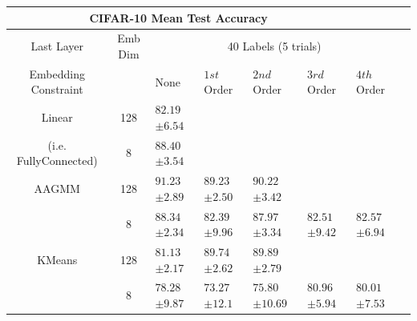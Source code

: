 \documentclass[10pt,twocolumn,letterpaper]{article}
\begin{document}
\begin{table}[ht!]
	\begin{tabularx}{\textwidth}{c|c|XXXXXX}
		\multicolumn{6}{c}{CIFAR-10 Mean Test Accuracy} \\ \hline\hline
		Last Layer &   Emb Dim   & \multicolumn{5}{c}{40 Labels (5 trials)}            \\ 
		\hline
		Embedding Constraint  &  & None & $1st$ Order & $2nd$ Order & $3rd$ Order & $4th$ Order  \\ 
		\hline
		Linear & 128  & $82.19$ \scriptsize{$\pm 6.54$}   &  &  &  &   \\
		(i.e. FullyConnected) & 8  & $88.40$ \scriptsize{$\pm 3.54$}      &  &  &  &   \\
		\hline
		AAGMM & 128  & $\boldsymbol{91.23}$ \scriptsize{$\pm 2.89$}    & $89.23$ \scriptsize{$\pm 2.50$} & $90.22$ \scriptsize{$\pm 3.42$} &  &  \\
		& 8  & $88.34$ \scriptsize{$\pm 2.34$}    & $82.39$ \scriptsize{$\pm 9.96$} & $87.97$ \scriptsize{$\pm 3.34$} & $82.51$ \scriptsize{$\pm 9.42$} & $82.57$ \scriptsize{$\pm 6.94$} \\
		\hline
		KMeans & 128  & $81.13$ \scriptsize{$\pm 2.17$}    & $89.74$ \scriptsize{$\pm 2.62$} & $\boldsymbol{89.89}$ \scriptsize{$\pm 2.79$} &  &  \\
		& 8  & $78.28$ \scriptsize{$\pm 9.87$}    & $73.27$ \scriptsize{$\pm 12.1$} & $75.80$ \scriptsize{$\pm 10.69$} & $80.96$ \scriptsize{$\pm 5.94$} & $80.01$ \scriptsize{$\pm 7.53$}  \\
		

\end{tabularx}
\end{table}
\end{document}
